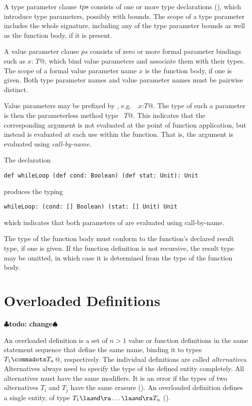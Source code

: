 \documentclass[a4paper,12pt,twoside,titlepage]{book}
\newcommand{\tps}{\mbox{\sl tps}}
\renewcommand{\todo}[1]{{$\clubsuit$\bf todo: #1$\spadesuit$}}
\begin{document}
A type parameter clause $\tps$ consists of one or more type
declarations (), which introduce type parameters,
possibly with bounds.  The scope of a type parameter includes
the whole signature, including any of the type parameter bounds as
well as the function body, if it is present.  

A value parameter clause $ps$ consists of zero or more formal
parameter bindings such as \lstinline@$x$: $T$@, which bind value
parameters and associate them with their types.  The scope of a formal
value parameter name $x$ is the function body, if one is
given. Both type parameter names and value parameter names must be
pairwise distinct.

Value parameters may be prefixed by , e.g.\
~\lstinline@def $x$:$T$@. The type of such a parameter is then the
parameterless method type ~\lstinline@[]$T$@. This indicates that the
corresponding argument is not evaluated at the point of function
application, but instead is evaluated at each use within the
function. That is, the argument is evaluated using {\em call-by-name}.

\example The declaration
\begin{lstlisting}
def whileLoop (def cond: Boolean) (def stat: Unit): Unit
\end{lstlisting}
produces the typing
\begin{lstlisting}
whileLoop: (cond: [] Boolean) (stat: [] Unit) Unit
\end{lstlisting}
which indicates that both parameters of  are evaluated using
call-by-name.

The type of the function body must conform to the function's declared
result type, if one is given. If the function definition is not
recursive, the result type may be omitted, in which case it is
determined from the type of the function body.

\section{Overloaded Definitions}
\label{sec:overloaded-defs}
\todo{change}

An overloaded definition is a set of $n > 1$ value or function
definitions in the same statement sequence that define the same name,
binding it to types ~\lstinline@$T_1 \commadots T_n$@, respectively.  The
individual definitions are called {\em alternatives}.  Alternatives
always need to specify the type of the defined entity completely.  All
alternatives must have the same modifiers. It is an error if the types
of two alternatives $T_i$ and $T_j$ have the same
erasure ().  An overloaded definition defines a
single entity, of type $T_1 \overload \ldots \overload T_n$ 
().
\end{document}
